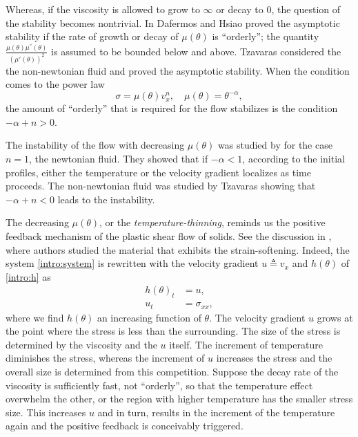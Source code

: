 \documentclass[a4paper,11pt]{article}
\begin{document}
Whereas, if the viscosity is allowed to grow to $\infty$ or decay to $0$, the question of the stability becomes nontrivial. In Dafermos and Hsiao \cite{dafermos_adiabatic_1983} proved the asymptotic stability if the rate of growth or decay of $\mu(\theta)$ is ``orderly''; the quantity $\frac{\mu(\theta)\mu^{''}(\theta)}{(\mu'(\theta))^2}$ is assumed to be bounded below and above. Tzavaras \cite{Tz_1986} considered the the non-newtonian fluid and proved the asymptotic stability. When the condition comes to the power law 
\begin{equation} \label{intro:powerlaw} \sigma= \mu(\theta)v_x^n, \quad \mu(\theta) = \theta^{-\alpha}, \end{equation}
the amount of ``orderly'' that is required for the flow stabilizes is the condition $-\alpha+n>0$.

The instability of the flow with decreasing $\mu(\theta)$ was studied by \cite{bertsch_effect_1991} for the case $n=1$, the newtonian fluid. They showed that if $-\alpha<1$, according to the initial profiles, either the temperature or the velocity gradient localizes as time proceeds. The non-newtonian fluid was studied by Tzavaras \cite{Tz_1987} showing that $-\alpha+n<0$ leads to the instability.

The decreasing $\mu(\theta)$, or the {\it temperature-thinning}, reminds us the positive feedback mechanism of the plastic shear flow of solids. See the discussion in \cite{KLT_2016}, where authors studied the material that exhibits the strain-softening. Indeed, the system \eqref{intro:system} is rewritten with the velocity gradient $u\triangleq v_x$ and $h(\theta)$ of \eqref{intro:h} as
\begin{align*}
 h(\theta)_t &=u,\\
 u_t&=\sigma_{xx},
\end{align*}
where we find $h(\theta)$ an increasing function of $\theta$. The velocity gradient $u$ grows at the point where the stress is less than the surrounding. The size of the stress is determined by the viscosity and the $u$ itself. The increment of temperature diminishes the stress, whereas the increment of $u$ increases the stress and the overall size is determined from this competition. Suppose the decay rate of the viscosity is sufficiently fast, not ``orderly'', so that the temperature effect overwhelm the other, or the region with higher temperature has the smaller stress size. This increases $u$ and in turn, results in the increment of the temperature again and the positive feedback is conceivably triggered. 
\end{document}
